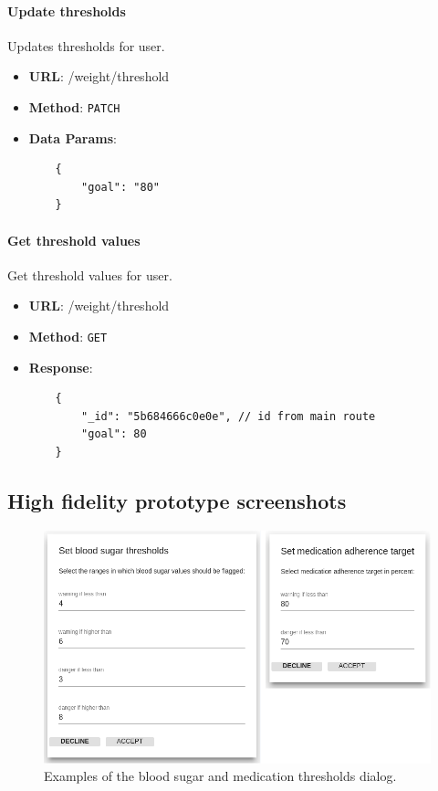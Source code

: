         \paragraph{Update thresholds} Updates thresholds for user.
        \begin{itemize}
            \item \textbf{URL}: /weight/threshold
            \item \textbf{Method}: \texttt{PATCH}
            \item \textbf{Data Params}: \begin{verbatim}
    {
        "goal": "80"
    }  
            \end{verbatim}
        \end{itemize}

        \paragraph{Get threshold values} Get threshold values for user.
        \begin{itemize}
            \item \textbf{URL}: /weight/threshold
            \item \textbf{Method}: \texttt{GET}
            \item \textbf{Response}: \begin{verbatim}
    {
        "_id": "5b684666c0e0e", // id from main route
        "goal": 80
    }
            \end{verbatim}
        \end{itemize}

\subsection{High fidelity prototype screenshots} \label{app_high_fidelity}

\begin{figure}[!htb]
    \centering
    \includegraphics[width=1\textwidth]{screenshots/thresholds}
    \caption{Examples of the blood sugar and medication thresholds dialog.}\label{fig:screen_thresholds}
\end{figure}

